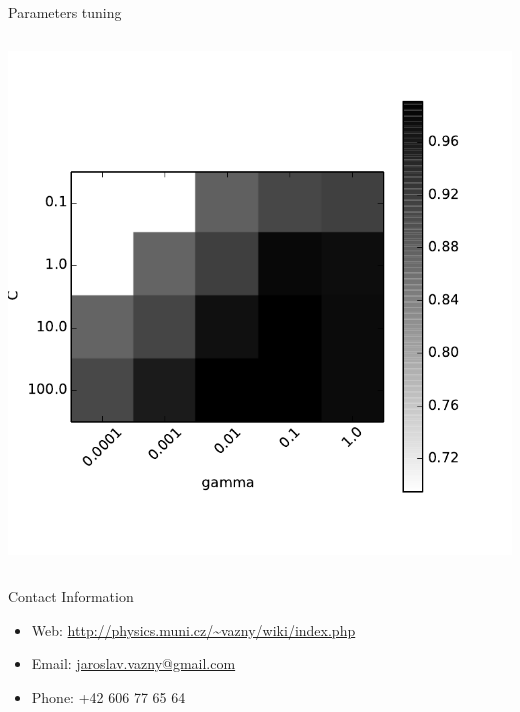 \documentclass[final,hyperref={pdfpagelabels=false}]{beamer}
\begin{document}
\begin{frame}[t]
\begin{columns}[t]
\begin{column}{.465\textwidth}
\begin{block}{Parameters tuning}
\begin{columns}
\begin{column}{.4\textwidth}
\includegraphics[width=1\linewidth]{tuning_pca}

\end{column}
\end{columns} %
\end{block}



\begin{block}{Contact Information}

\begin{itemize}
\item Web: \url{http://physics.muni.cz/~vazny/wiki/index.php}
\item Email: \href{mailto:jaroslav.vazny@gmail.com}{jaroslav.vazny@gmail.com}
\item Phone: +42 606 77 65 64
\end{itemize}

\end{block}



\end{column}
\end{columns}
\end{frame}
\end{document}
